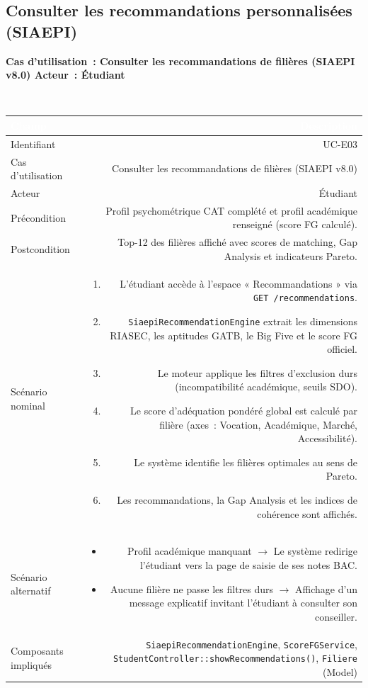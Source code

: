 \documentclass[a4paper,12pt]{article}
\newcommand{\ucheader}[2]{%
  \noindent\colorbox{capblue}{\parbox{\dimexpr\linewidth-2\fboxsep}{%
    \color{white}\bfseries\large Cas d'utilisation~: #1 \hfill \normalsize Acteur~: #2
  }}\\[2pt]
}
\begin{document}
\vspace{1em}

\subsection{Consulter les recommandations personnalisées (SIAEPI)}
\ucheader{Consulter les recommandations de filières (SIAEPI v8.0)}{Étudiant}

\noindent
\begin{tabular}{|L|R|}
\hline
{}\textcolor{white}{\textbf{Champ}} & \textcolor{white}{\textbf{Description}} \\
\hline
{}Identifiant & UC-E03 \\
\hline
Cas d'utilisation & Consulter les recommandations de filières (SIAEPI v8.0) \\
\hline
{}Acteur & Étudiant \\
\hline
Précondition & Profil psychométrique CAT complété et profil académique renseigné (score FG calculé). \\
\hline
{}Postcondition & Top-12 des filières affiché avec scores de matching, Gap Analysis et indicateurs Pareto. \\
\hline
Scénario nominal &
\begin{enumerate}
  \item L'étudiant accède à l'espace « Recommandations » via \texttt{GET /recommendations}.
  \item \texttt{SiaepiRecommendationEngine} extrait les dimensions RIASEC, les aptitudes GATB, le Big Five et le score FG officiel.
  \item Le moteur applique les filtres d'exclusion durs (incompatibilité académique, seuils SDO).
  \item Le score d'adéquation pondéré global est calculé par filière (axes~: Vocation, Académique, Marché, Accessibilité).
  \item Le système identifie les filières optimales au sens de Pareto.
  \item Les recommandations, la Gap Analysis et les indices de cohérence sont affichés.
\end{enumerate} \\
\hline
{}Scénario alternatif &
\begin{itemize}
  \item Profil académique manquant $\rightarrow$ Le système redirige l'étudiant vers la page de saisie de ses notes BAC.
  \item Aucune filière ne passe les filtres durs $\rightarrow$ Affichage d'un message explicatif invitant l'étudiant à consulter son conseiller.
\end{itemize} \\
\hline
Composants impliqués & \texttt{SiaepiRecommendationEngine}, \texttt{ScoreFGService}, \texttt{StudentController::showRecommendations()}, \texttt{Filiere} (Model) \\
\hline
\end{tabular}
\end{document}
